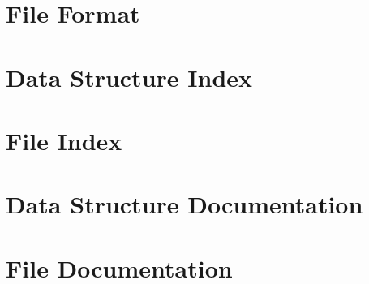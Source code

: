 \documentclass[twoside]{book}
\newcommand{\+}{\discretionary{\mbox{\scriptsize$\hookleftarrow$}}{}{}}
\newcommand{\clearemptydoublepage}{%
  \newpage{\pagestyle{empty}\cleardoublepage}%
}
\begin{document}
\chapter{File Format}
\label{file_format}
\hypertarget{file_format}{}

\chapter{Data Structure Index}

\chapter{File Index}

\chapter{Data Structure Documentation}







\chapter{File Documentation}












\backmatter
\newpage
{}
\clearemptydoublepage
{}
\printindex
\end{document}
